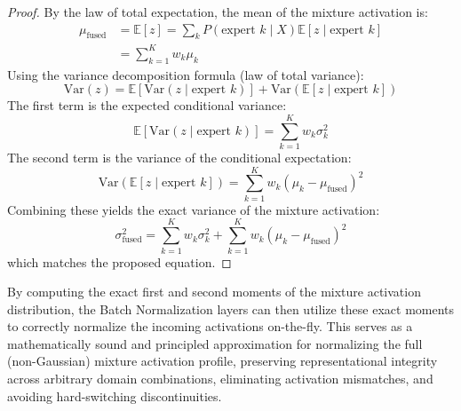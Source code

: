 \documentclass{article}
\theoremstyle{plain}
\theoremstyle{definition}
\theoremstyle{remark}
\begin{document}
\begin{proof}
By the law of total expectation, the mean of the mixture activation is:
\begin{align}
\mu_{\text{fused}} &= \mathbb{E}[z] = \sum_{k} P(\text{expert } k \mid X) \mathbb{E}[z \mid
\text{expert } k] \nonumber \\
    &= \sum_{k=1}^K w_k \mu_k
\end{align}
Using the variance decomposition formula (law of total variance):
\begin{equation}
\text{Var}(z) = \mathbb{E}[\text{Var}(z \mid \text{expert } k)] + \text{Var}(\mathbb{E}[z \mid
\text{expert } k])
\end{equation}
The first term is the expected conditional variance:
\begin{equation}
    \mathbb{E}[\text{Var}(z \mid \text{expert } k)] = \sum_{k=1}^K w_k \sigma^2_k
\end{equation}
The second term is the variance of the conditional expectation:
\begin{equation}
\text{Var}(\mathbb{E}[z \mid \text{expert } k]) = \sum_{k=1}^K w_k (\mu_k - \mu_{\text{fused}})^2
\end{equation}
Combining these yields the exact variance of the mixture activation:
\begin{equation}
\sigma^2_{\text{fused}} = \sum_{k=1}^K w_k \sigma^2_k + \sum_{k=1}^K w_k (\mu_k -
\mu_{\text{fused}})^2
\end{equation}
which matches the proposed equation.
\end{proof}
By computing the exact first and second moments of the mixture activation distribution, the Batch
Normalization layers can then utilize these exact moments to correctly normalize the incoming
activations on-the-fly. This serves as a mathematically sound and principled approximation for
normalizing the full (non-Gaussian) mixture activation profile, preserving representational
integrity across arbitrary domain combinations, eliminating activation mismatches, and avoiding
hard-switching discontinuities.
\end{document}
